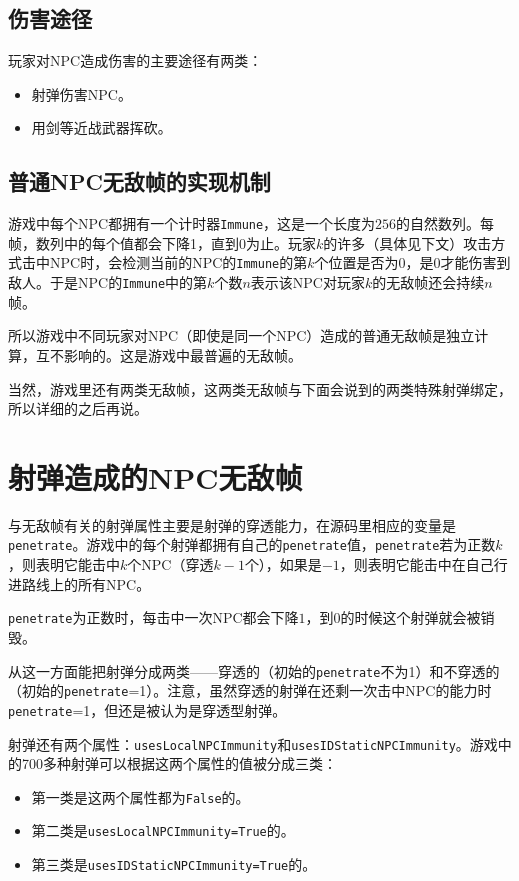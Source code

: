 \subsection{伤害途径}
玩家对NPC造成伤害的主要途径有两类：
\begin{itemize}
\item 射弹伤害NPC。
\item 用剑等近战武器挥砍。
\end{itemize}

\subsection{普通NPC无敌帧的实现机制}\label{sec24}
游戏中每个NPC都拥有一个计时器\lstinline{Immune}，这是一个长度为$256$的自然数列。每帧，数列中的每个值都会下降1，直到0为止。玩家$k$的许多（具体见下文）攻击方式击中NPC时，会检测当前的NPC的\lstinline{Immune}的第$k$个位置是否为$0$，是$0$才能伤害到敌人。于是NPC的\lstinline{Immune}中的第$k$个数$n$表示该NPC对玩家$k$的无敌帧还会持续$n$帧。

所以游戏中不同玩家对NPC（即使是同一个NPC）造成的普通无敌帧是独立计算，互不影响的。这是游戏中最普遍的无敌帧。

当然，游戏里还有两类无敌帧，这两类无敌帧与下面会说到的两类特殊射弹绑定，所以详细的之后再说。

\section{射弹造成的NPC无敌帧}\label{sec25}
与无敌帧有关的射弹属性主要是射弹的穿透能力，在源码里相应的变量是\lstinline{penetrate}。游戏中的每个射弹都拥有自己的\lstinline{penetrate}值，\lstinline{penetrate}若为正数$k$，则表明它能击中$k$个NPC（穿透$k-1$个），如果是$-1$，则表明它能击中在自己行进路线上的所有NPC。

\lstinline{penetrate}为正数时，每击中一次NPC都会下降$1$，到$0$的时候这个射弹就会被销毁。

从这一方面能把射弹分成两类——穿透的（初始的\lstinline{penetrate}不为1）和不穿透的（初始的\lstinline{penetrate}=1）。注意，虽然穿透的射弹在还剩一次击中NPC的能力时\lstinline{penetrate}=1，但还是被认为是穿透型射弹。

射弹还有两个属性：\lstinline{usesLocalNPCImmunity}和\lstinline{usesIDStaticNPCImmunity}。游戏中的700多种射弹可以根据这两个属性的值被分成三类：
\begin{itemize}
\item 第一类是这两个属性都为\lstinline{False}的。
\item 第二类是\lstinline{usesLocalNPCImmunity=True}的。
\item 第三类是\lstinline{usesIDStaticNPCImmunity=True}的。
\end{itemize}

